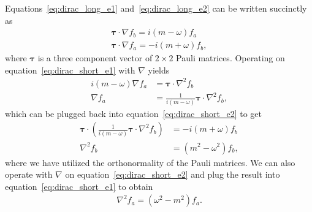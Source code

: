 \documentclass[titlepage,letterpaper,onecolumn,11pt,final]{report}
\numberwithin{equation}{section}
\numberwithin{figure}{section}
\begin{document}
%
Equations~\ref{eq:dirac_long_e1} and~\ref{eq:dirac_long_e2} can be written succinctly as
\begin{subequations}
\begin{align}
	\label{eq:dirac_short_e1}
	\mathbf{\tau} \cdot \nabla f_{b} = i(m - \omega) f_{a} \\
	\label{eq:dirac_short_e2}
	\mathbf{\tau} \cdot \nabla f_{a} = -i(m + \omega) f_{b},
\end{align}
\end{subequations}
%
where $\mathbf{\tau}$ is a three component vector of $2 \times 2$ Pauli matrices. Operating on equation~\ref{eq:dirac_short_e1} with $\nabla$ yields
\begin{equation}
\begin{split}
	 i(m - \omega) \nabla f_{a} &= \mathbf{\tau} \cdot \nabla^{2} f_{b} \\
	\nabla f_{a} &= \frac{1}{i(m - \omega)} \mathbf{\tau} \cdot \nabla^{2} f_{b},
\end{split}
\end{equation}
%
which can be plugged back into equation~\ref{eq:dirac_short_e2} to get
\begin{equation}
\begin{split}
	\mathbf{\tau} \cdot \left( \frac{1}{i(m - \omega)} \mathbf{\tau} \cdot \nabla^{2} f_{b} \right) &= -i(m + \omega) f_{b} \\
	\nabla^{2} f_{b} &= (m^{2} - \omega^{2}) f_{b},
\end{split}
\end{equation}
where we have utilized the orthonormality of the Pauli matrices. We can also operate with $\nabla$ on equation~\ref{eq:dirac_short_e2} and plug the result into equation~\ref{eq:dirac_short_e1} to obtain
\begin{align}
	\nabla^{2} f_{a} = (\omega^{2} - m^{2} ) f_{a}.
\end{align}
\end{document}
